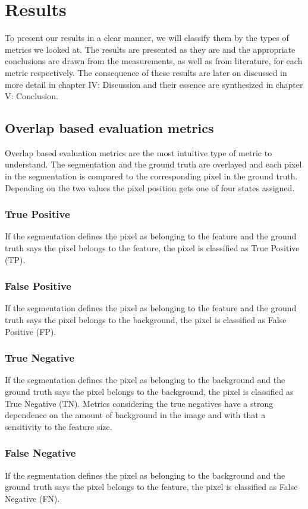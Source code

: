 \documentclass[journal]{IEEEtran}
\begin{document}
\clearpage

\section{Results}
\label{Results}

To present our results in a clear manner, we will classify them by the types of metrics we looked at. The results are presented as they are and the appropriate conclusions are drawn from the measurements, as well as from literature, for each metric respectively. The consequence of these results are later on discussed in more detail in chapter IV: Discussion and their essence are synthesized in chapter V: Conclusion.

\subsection{Overlap based evaluation metrics}

Overlap based evaluation metrics are the most intuitive type of metric to understand. The segmentation and the ground truth are overlayed and each pixel in the segmentation is compared to the corresponding pixel in the ground truth. Depending on the two values the pixel position gets one of four states assigned.

\hspace{1in}

{\parindent0pt   %
		
\subsubsection{True Positive}
If the segmentation defines the pixel as belonging to the feature and the ground truth says the pixel belongs to the feature, the pixel is classified as True Positive (TP).

\subsubsection{False Positive}
If the segmentation defines the pixel as belonging to the feature and the ground truth says the pixel belongs to the background, the pixel is classified as False Positive (FP).

\subsubsection{True Negative}
If the segmentation defines the pixel as belonging to the background and the ground truth says the pixel belongs to the background, the pixel is classified as True Negative (TN). Metrics considering the true negatives have a strong dependence on the amount of background in the image and with that a sensitivity to the feature size.

\subsubsection{False Negative}
If the segmentation defines the pixel as belonging to the background and the ground truth says the pixel belongs to the feature, the pixel is classified as False Negative (FN).

} %
\end{document}
